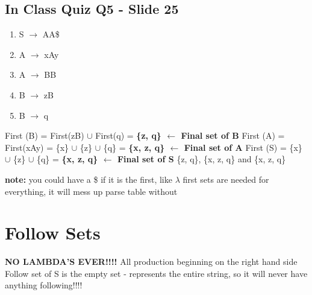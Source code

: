 \documentclass{report}
\begin{document}
\subsection{In Class Quiz Q5 - Slide 25}
\vspace{-1.5em}
\begin{multicols}{2}
  \begin{enumerate}
    \setlength\itemsep{-.25em}
    \item S $\rightarrow$ AA\$
    \item A $\rightarrow$ xAy
    \item A $\rightarrow$ BB
    \item B $\rightarrow$ zB
    \item B $\rightarrow$ q\newline
  \end{enumerate}
  \setlength{\leftskip}{-12em}
First (B) = First(zB) $\cup$ First(q) = \textbf{ \{z, q\}  $\leftarrow$ Final set of B}\newline
First (A) = First(xAy) \newline
\indent\hspace{1cm}= \{x\} $\cup$ \{z\} $\cup$ \{q\} = \textbf{ \{x, z, q\} $\leftarrow$ Final set of A}\newline
First (S) = \{x\} $\cup$ \{z\} $\cup$ \{q\} = \textbf{ \{x, z, q\} $\leftarrow$ Final set of S}\newline
\{z, q\}, \{x, z, q\} and \{x, z, q\}
\end{multicols}
\vspace{-1em}
\noindent\textbf{note:} you could have a \$ if it is the first, like $\lambda$\newline
\indent\hspace{.5cm}first sets are needed for everything, it will mess up parse table without

\section{Follow Sets}
\textbf{NO LAMBDA'S EVER!!!!}
All production beginning on the right hand side\newline
Follow set of S is the empty set
 - represents the entire string, so it will never have anything following!!!!
\end{document}
